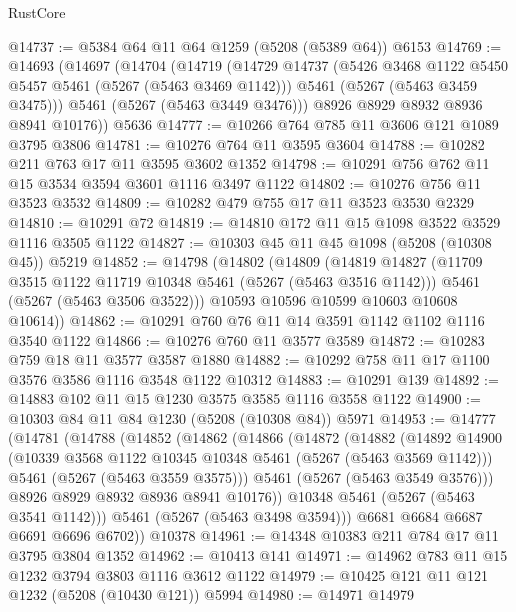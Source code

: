 \begin{lexlean}{RustCore}
\begin{coremodule}
@14737 := @5384 @64 @11 @64 @1259 (@5208 (@5389 @64)) @6153
@14769 := @14693
    (@14697
      (@14704
        (@14719
          (@14729
            @14737
            (@5426 @3468 @1122 @5450 @5457 @5461 (@5267 (@5463 @3469 @1142)))
            @5461
            (@5267 (@5463 @3459 @3475)))
          @5461
          (@5267 (@5463 @3449 @3476)))
        @8926
        @8929
        @8932
        @8936
        @8941
        @10176))
    @5636
@14777 := @10266 @764 @785 @11 @3606 @121 @1089 @3795 @3806
@14781 := @10276 @764 @11 @3595 @3604
@14788 := @10282 @211 @763 @17 @11 @3595 @3602 @1352
@14798 := @10291 @756 @762 @11 @15 @3534 @3594 @3601 @1116 @3497 @1122
@14802 := @10276 @756 @11 @3523 @3532
@14809 := @10282 @479 @755 @17 @11 @3523 @3530 @2329
@14810 := @10291 @72
@14819 := @14810 @172 @11 @15 @1098 @3522 @3529 @1116 @3505 @1122
@14827 := @10303 @45 @11 @45 @1098 (@5208 (@10308 @45)) @5219
@14852 := @14798
    (@14802
      (@14809
        (@14819
          @14827
          (@11709 @3515 @1122 @11719 @10348 @5461 (@5267 (@5463 @3516 @1142)))
          @5461
          (@5267 (@5463 @3506 @3522)))
        @10593
        @10596
        @10599
        @10603
        @10608
        @10614))
@14862 := @10291 @760 @76 @11 @14 @3591 @1142 @1102 @1116 @3540 @1122
@14866 := @10276 @760 @11 @3577 @3589
@14872 := @10283 @759 @18 @11 @3577 @3587 @1880
@14882 := @10292 @758 @11 @17 @1100 @3576 @3586 @1116 @3548 @1122 @10312
@14883 := @10291 @139
@14892 := @14883 @102 @11 @15 @1230 @3575 @3585 @1116 @3558 @1122
@14900 := @10303 @84 @11 @84 @1230 (@5208 (@10308 @84)) @5971
@14953 := @14777
    (@14781
      (@14788
        (@14852
          (@14862
            (@14866
              (@14872
                (@14882
                  (@14892
                    @14900
                    (@10339 @3568 @1122 @10345 @10348 @5461 (@5267 (@5463 @3569 @1142)))
                    @5461
                    (@5267 (@5463 @3559 @3575)))
                  @5461
                  (@5267 (@5463 @3549 @3576)))
                @8926
                @8929
                @8932
                @8936
                @8941
                @10176))
            @10348
            @5461
            (@5267 (@5463 @3541 @1142)))
          @5461
          (@5267 (@5463 @3498 @3594)))
        @6681
        @6684
        @6687
        @6691
        @6696
        @6702))
    @10378
@14961 := @14348 @10383 @211 @784 @17 @11 @3795 @3804 @1352
@14962 := @10413 @141
@14971 := @14962 @783 @11 @15 @1232 @3794 @3803 @1116 @3612 @1122
@14979 := @10425 @121 @11 @121 @1232 (@5208 (@10430 @121)) @5994
@14980 := @14971 @14979

\end{coremodule}
\end{lexlean}
